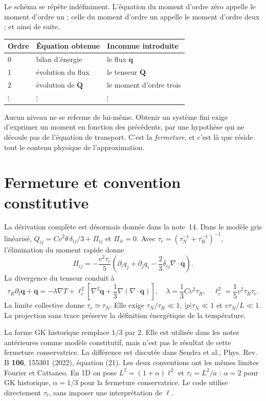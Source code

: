 \documentclass[11pt,a4paper]{article}
\begin{document}
Le schéma se répète indéfiniment. L'équation du moment d'ordre zéro appelle le moment d'ordre un ;
celle du moment d'ordre un appelle le moment d'ordre deux ; et ainsi de suite.

\begin{center}
\begin{tabular}{@{}lll@{}}
\toprule
Ordre & Équation obtenue & Inconnue introduite \\
\midrule
0 & bilan d'énergie & le flux $\mathbf{q}$ \\
1 & évolution du flux & le tenseur $\mathbf{Q}$ \\
2 & évolution de $\mathbf{Q}$ & le moment d'ordre trois \\
$\vdots$ & $\vdots$ & $\vdots$ \\
\bottomrule
\end{tabular}
\end{center}

Aucun niveau ne se referme de lui-même. Obtenir un système fini exige d'exprimer un moment en
fonction des précédents, par une hypothèse qui ne découle pas de l'équation de transport. C'est la
\emph{fermeture}, et c'est là que réside tout le contenu physique de l'approximation.

\section{Fermeture et convention constitutive}
La dérivation complète est désormais donnée dans la note~14. Dans le modèle
gris linéarisé, $Q_{ij}=Cv^2\theta\,\delta_{ij}/3+\Pi_{ij}$ et
$\Pi_{ii}=0$. Avec
$\tau_c=(\tau_N^{-1}+\tau_R^{-1})^{-1}$, l'élimination du moment rapide donne
\[
 \Pi_{ij}=-\frac{v^2\tau_c}{5}
 \left(\partial_iq_j+\partial_jq_i-\frac23\delta_{ij}\nabla\cdot\mathbf q\right).
\]
La divergence du tenseur conduit à
\[
 \tau_R\partial_t\mathbf q+\mathbf q=-\lambda\nabla T+
 \ell_c^2\left[\nabla^2\mathbf q+\frac13\nabla(\nabla\cdot\mathbf q)\right],
 \quad
 \lambda=\frac13Cv^2\tau_R,\quad \ell_c^2=\frac15v^2\tau_R\tau_c .
\]
La limite collective donne $\tau_c\simeq\tau_N$.
Elle exige $\tau_N/\tau_R\ll1$, $|p|\tau_N\ll1$ et $v\tau_N/L\ll1$.
La projection sans trace préserve la définition énergétique de la température.

La forme GK historique remplace $1/3$ par $2$. Elle est utilisée dans les
notes antérieures comme modèle constitutif, mais n'est pas le résultat de
cette fermeture conservatrice. La différence est discutée dans Sendra et al.,
Phys. Rev. B \textbf{106}, 155301 (2022), équation (21).
Les deux conventions ont les mêmes limites Fourier et Cattaneo.
En 1D on pose $L^2=(1+\alpha)\ell^2$ et $\tau_\ell=L^2/a$ :
$\alpha=2$ pour GK historique, $\alpha=1/3$ pour la fermeture conservatrice.
Le code utilise directement $\tau_\ell$, sans imposer une interprétation de $\ell$.
\end{document}
